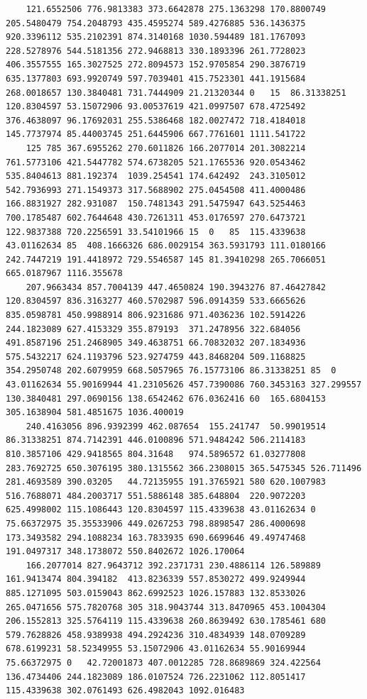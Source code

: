 \documentclass[UTF8]{ctexart}
\begin{document}
\begin{lstlisting}
	121.6552506	776.9813383	373.6642878	275.1363298	170.8800749	205.5480479	754.2048793	435.4595274	589.4276885	536.1436375	920.3396112	535.2102391	874.3140168	1030.594489	181.1767093	228.5278976	544.5181356	272.9468813	330.1893396	261.7728023	406.3557555	165.3027525	272.8094573	152.9705854	290.3876719	635.1377803	693.9920749	597.7039401	415.7523301	441.1915684	268.0018657	130.3840481	731.7444909	21.21320344	0	15	86.31338251	120.8304597	53.15072906	93.00537619	421.0997507	678.4725492	376.4638097	96.17692031	255.5386468	182.0027472	718.4184018	145.7737974	85.44003745	251.6445906	667.7761601	1111.541722
	125	785	367.6955262	270.6011826	166.2077014	201.3082214	761.5773106	421.5447782	574.6738205	521.1765536	920.0543462	535.8404613	881.192374	1039.254541	174.642492	243.3105012	542.7936993	271.1549373	317.5688902	275.0454508	411.4000486	166.8831927	282.931087	150.7481343	291.5475947	643.5254463	700.1785487	602.7644648	430.7261311	453.0176597	270.6473721	122.9837388	720.2256591	33.54101966	15	0	85	115.4339638	43.01162634	85	408.1666326	686.0029154	363.5931793	111.0180166	242.7447219	191.4418972	729.5546587	145	81.39410298	265.7066051	665.0187967	1116.355678
	207.9663434	857.7004139	447.4650824	190.3943276	87.46427842	120.8304597	836.3163277	460.5702987	596.0914359	533.6665626	835.0598781	450.9988914	806.9231686	971.4036236	102.5914226	244.1823089	627.4153329	355.879193	371.2478956	322.684056	491.8587196	251.2468905	349.4638751	66.70832032	207.1834936	575.5432217	624.1193796	523.9274759	443.8468204	509.1168825	354.2950748	202.6079959	668.5057965	76.15773106	86.31338251	85	0	43.01162634	55.90169944	41.23105626	457.7390086	760.3453163	327.299557	130.3840481	297.0690156	138.6542462	676.0362416	60	165.6804153	305.1638904	581.4851675	1036.400019
	240.4163056	896.9392399	462.087654	155.241747	50.99019514	86.31338251	874.7142391	446.0100896	571.9484242	506.2114183	810.3857106	429.9418565	804.31648	974.5896572	61.03277808	283.7692725	650.3076195	380.1315562	366.2308015	365.5475345	526.711496	281.4693589	390.03205	44.72135955	191.3765921	580	620.1007983	516.7688071	484.2003717	551.5886148	385.648804	220.9072203	625.4998002	115.1086443	120.8304597	115.4339638	43.01162634	0	75.66372975	35.35533906	449.0267253	798.8898547	286.4000698	173.3493582	294.1088234	163.7833935	690.6699646	49.49747468	191.0497317	348.1738072	550.8402672	1026.170064
	166.2077014	827.9643712	392.2371731	230.4886114	126.589889	161.9413474	804.394182	413.8236339	557.8530272	499.9249944	885.1271095	503.0159043	862.6992523	1026.157883	132.8533026	265.0471656	575.7820768	305	318.9043744	313.8470965	453.1004304	206.1552813	325.5764119	115.4339638	260.8639492	630.1785461	680	579.7628826	458.9389938	494.2924236	310.4834939	148.0709289	678.6199231	58.52349955	53.15072906	43.01162634	55.90169944	75.66372975	0	42.72001873	407.0012285	728.8689869	324.422564	136.4734406	244.1823089	186.0107524	726.2231062	112.8051417	115.4339638	302.0761493	626.4982043	1092.016483

\end{lstlisting}
\end{document}
